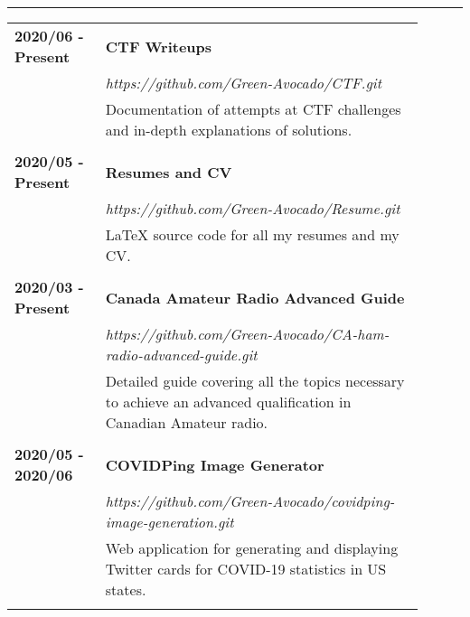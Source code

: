 \documentclass[letterpaper]{article}
\newcommand{\horizontalLine}{%
    \rule{\linewidth}{0.2pt}
    \vspace{1ex}
}
\begin{document}
        \horizontalLine

        \begin{tabular}{p{0.2\linewidth} p{0.7\linewidth}} 
            \textbf{2020/06 - Present} & \large\textbf{CTF Writeups} \\
            & \emph{https://github.com/Green-Avocado/CTF.git} \\
            & Documentation of attempts at CTF challenges and in-depth explanations of solutions. \\
            \\
            \textbf{2020/05 - Present} & \large\textbf{Resumes and CV} \\
            & \emph{https://github.com/Green-Avocado/Resume.git} \\
            & LaTeX source code for all my resumes and my CV. \\
            \\
            \textbf{2020/03 - Present} & \large\textbf{Canada Amateur Radio Advanced Guide} \\
            & \emph{https://github.com/Green-Avocado/CA-ham-radio-advanced-guide.git} \\
            & Detailed guide covering all the topics necessary to achieve an advanced qualification in Canadian Amateur radio. \\
            \\
            \textbf{2020/05 - 2020/06} & \large\textbf{COVIDPing Image Generator} \\
            & \emph{https://github.com/Green-Avocado/covidping-image-generation.git} \\
            & Web application for generating and displaying Twitter cards for COVID-19 statistics in US states. \\
            \\
        \end{tabular}
\end{document}
